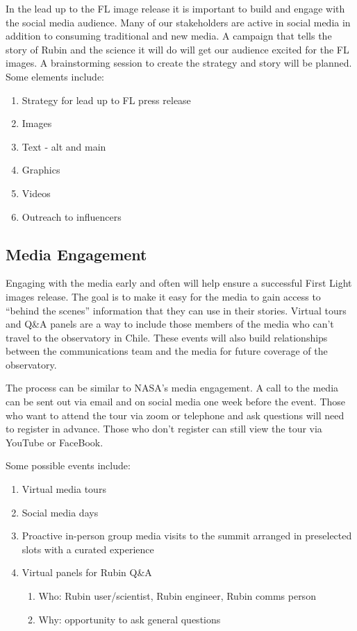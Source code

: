 In the lead up to the FL image release it is important to build and engage with the social media audience. Many of our stakeholders are active in social media in addition to consuming traditional and new media. A campaign that tells the story of Rubin and the science it will do will get our audience excited for the FL images. A brainstorming session to create the strategy and story will be planned. Some elements include:
\begin{enumerate}
\item Strategy for lead up to FL press release
\item Images
\item Text - alt and main
\item Graphics
\item Videos
\item Outreach to influencers
\end{enumerate}

\subsection{Media Engagement}
Engaging with the media early and often will help ensure a successful First Light images release. The goal is to make it easy for the media to gain access to “behind the scenes” information that they can use in their stories. Virtual tours and Q\&A panels are a way to include those members of the media who can’t travel to the observatory in Chile. These events will also build relationships between the communications team and the media for future coverage of the observatory.

The process can be similar to NASA’s media engagement. A call to the media can be sent out via email and on social media one week before the event. Those who want to attend the tour via zoom or telephone and ask questions will need to register in advance. Those who don’t register can still view the tour via YouTube or FaceBook.

Some possible events include:
\begin{enumerate}
\item Virtual media tours
\item Social media days
\item Proactive in-person group media visits to the summit arranged in preselected slots with a curated experience
\item Virtual panels for Rubin Q\&A
\begin{enumerate}
\item Who: Rubin user/scientist, Rubin engineer, Rubin comms person
\item Why: opportunity to ask general questions
\end{enumerate}
\end{enumerate}

